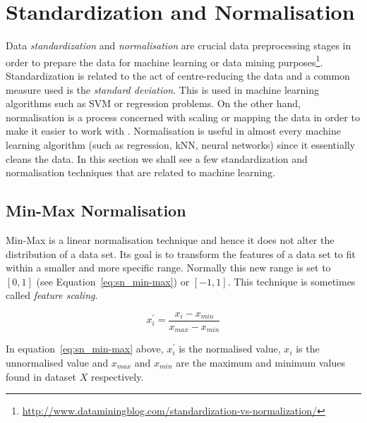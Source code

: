 \chapter{Standardization and Normalisation}

\label{ch:standardization-and-normalization}

Data \emph{standardization} and \emph{normalisation} are crucial data preprocessing stages in order to prepare the data for machine learning or data mining purposes\footnote{\url{http://www.dataminingblog.com/standardization-vs-normalization/}}.  Standardization is related to the act of centre-reducing the data and a common measure used is the \emph{standard deviation}.  This is used in machine learning algorithms such as SVM  or regression  problems.  On the other hand, normalisation is a process concerned with scaling or mapping the data in order to make it easier to work with \citep{patro2015normalization}.  Normalisation is useful in almost every machine learning algorithm (such as regression, kNN, neural networks) since it essentially cleans the data.  In this section we shall see a few standardization and normalisation techniques that are related to machine learning.



\section{Min-Max Normalisation}
Min-Max is a linear normalisation technique and hence it does not alter the distribution of a data set.  Its goal is to transform the features of a data set to fit within a smaller and more specific range.  Normally this new range is set to $[0,1]$ (see Equation~\ref{eq:sn_min-max}) or $[-1,1]$.  This technique is sometimes called \emph{feature scaling}.

\begin{equation}
\label{eq:sn_min-max}
x^{\prime}_{i} = \frac{x_{i} - x_{min}}{x_{max} - x_{min}}
\end{equation}

In equation~\ref{eq:sn_min-max} above, $x^{\prime}_i$ is the normalised value, $x_{i}$ is the unnormalised value and $x_{max}$ and $x_{min}$ are the maximum and minimum values found in dataset $X$ respectively.  

